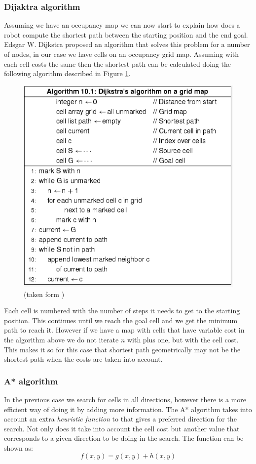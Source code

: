 \subsubsection{Dijaktra algorithm}
Assuming we have an occupancy map we can now start to explain how does a robot compute the shortest path between the starting position and the end goal. Edsgar W. Dijkstra proposed an algorithm that solves this problem for a number of nodes, in our case we have cells on an occupancy grid map. Assuming with each cell costs the same then the shortest path can be calculated doing the following algorithm described in Figure \ref{fig:dalg}. 
\begin{figure}[h] 
\centerline{\includegraphics [width=0.7 \textwidth]{imgs/chapter5/Dalg.png}}
\caption{(taken form \cite{Ben-Ari2018})}
\label{fig:dalg}
\end{figure}
Each cell is numbered with the number of steps it needs to get to the starting position. This continues until we reach the goal cell and we get the minimum path to reach it. However if we have a map with cells that have variable cost in the algorithm above we do not iterate $n$ with plus one, but with the cell cost. This makes it so for this case that  shortest path geometrically may not be the shortest path when the costs are taken into account.

\subsubsection{A* algorithm}
In the previous case we search for cells in all directions, however there is a more efficient way of doing it by adding more information. The A* algorithm takes into account an extra \textit{heuristic function} to that gives a preferred direction for the search. Not only does it take into account the cell cost but another value that corresponds to a given direction to be doing in  the search. The function can be shown as:
\begin{equation}
    f(x,y)=g(x,y) + h(x,y)
\end{equation}
